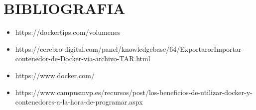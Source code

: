\section{BIBLIOGRAFIA} 

\begin{itemize}
\item https://dockertips.com/volumenes
\item https://cerebro-digital.com/panel/knowledgebase/64/ExportarorImportar-contenedor-de-Docker-via-archivo-TAR.html
\item  https://www.docker.com/
\item https://www.campusmvp.es/recursos/post/los-beneficios-de-utilizar-docker-y-contenedores-a-la-hora-de-programar.aspx

\end{itemize}